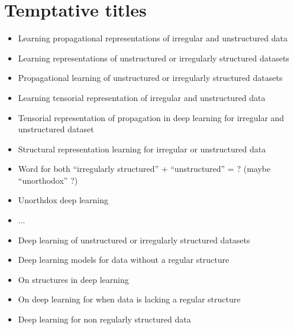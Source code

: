 \section*{Temptative titles}

\begin{itemize}
\item Learning propagational representations of irregular and unstructured data
\item Learning representations of unstructured or irregularly structured datasets
\item Propagational learning of unstructured or irregularly structured datasets
\item Learning tensorial representation of irregular and unstructured data
\item Tensorial representation of propagation in deep learning for irregular and unstructured dataset
\item Structural representation learning for irregular or unstructured data
\item Word for both ``irregularly structured'' + ``unstructured'' = ? (maybe ``unorthodox'' ?)
\item Unorthdox deep learning
\item ...
\item Deep learning of unstructured or irregularly structured datasets
\item Deep learning models for data without a regular structure
\item On structures in deep learning
\item On deep learning for when data is lacking a regular structure
\item Deep learning for non regularly structured data
\end{itemize}
